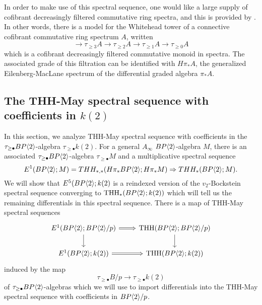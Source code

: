 In order to make use of this spectral sequence, one would like a large supply of cofibrant decreasingly filtered commutative ring spectra, and this is provided by \cite[Thm. 4.2.1]{THH-May}. In other words, there is a model for the Whitehead tower of a connective cofibrant commutative ring spectrum $A$, written 
\[ \rightarrow  \tau_{\ge 3}A \rightarrow \tau_{\ge 2}A \rightarrow \tau_{\ge 1}A \rightarrow \tau_{\ge 0} A \]
which is a cofibrant decreasingly filtered commutative monoid in spectra. The associated grade of this filtration can be identified with $H\pi_*A$, the generalized Eilenberg-MacLane spectrum of the differential graded algebra $\pi_*A$. 


\subsection{The THH-May spectral sequence with coefficients in $k(2)$}

In this section, we analyze THH-May spectral sequence with coefficients in the $\tau_{\ge \bullet}BP\langle 2 \rangle$-algebra $\tau_{\ge \bullet}k(2)$. For a general $A_{\infty}$ $BP\langle 2 \rangle$-algebra $M$, there is an associated $\tau_{\ge \bullet}BP\langle 2 \rangle$-algebra 
$\tau_{\ge \bullet}M$ and a multiplicative spectral sequence
\begin{equation}\label{THH-May-BM} E^1(BP\langle 2 \rangle;M) =THH_{*,*}(H\pi_*BP\langle 2 \rangle;H\pi_*M)\Rightarrow THH_*(BP\langle 2 \rangle;M).\end{equation}
We will show that $E^5(BP\langle 2 \rangle;k(2)$ is a reindexed version of the $v_2$-Bockstein spectral sequence converging to $\operatorname{THH}_*(BP\langle 2 \rangle;k(2))$ which will tell us the remaining differentials in this spectral sequence. 
There is a map of THH-May spectral sequences 
\[
\begin{tikzcd}
	E^1(\B;\B/p)\arrow[r, Rightarrow]\arrow[d]& \THH(\B;\B/p)\arrow[d]\\
	E^1(\B;k(2))\arrow[r, Rightarrow] & \THH(\B;k(2))
\end{tikzcd}
\]
induced by the map 
\[ \tau_{\ge \bullet}B/p \to \tau_{\ge \bullet}k(2)\]
of $\tau_{\ge \bullet}BP\langle 2 \rangle$-algebras
which we will use to import differentials into the THH-May spectral sequence with coefficients in $BP\langle 2 \rangle/p$. 

